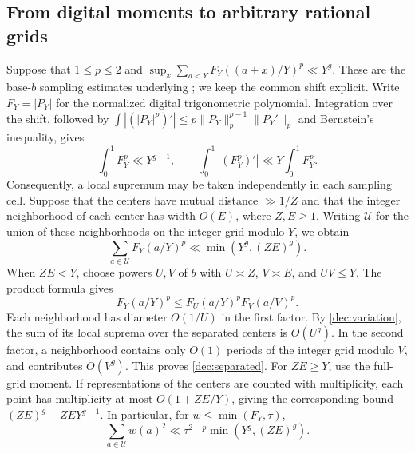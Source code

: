 \documentclass[11pt,a4paper]{article}
\theoremstyle{paperplain}
\numberwithin{equation}{section}
\begin{document}
\subsection{From digital moments to arbitrary rational grids}
\label{dec:grids}

Suppose that $1\le p\le2$ and
$\sup_x\sum_{a<Y}F_Y((a+x)/Y)^p\ll Y^g$.
These are the base-$b$ sampling estimates underlying
\cite[Lemmas 10.5--10.7]{Maynard2019}; we keep the common shift explicit.
Write $F_Y=|P_Y|$ for the normalized digital trigonometric polynomial.
Integration over the shift, followed by
$\int|(|P_Y|^p)'|\le p\|P_Y\|_p^{p-1}\|P_Y'\|_p$
and Bernstein's inequality, gives
\begin{equation}\label{dec:variation}
 \int_0^1F_Y^p\ll Y^{g-1},\qquad
 \int_0^1|(F_Y^p)'|\ll Y\int_0^1F_Y^p.
\end{equation}
Consequently, a local supremum may be taken independently in each sampling
cell. Suppose that the centers have mutual distance $\gg1/Z$ and that
the integer neighborhood of each center has width $O(E)$, where $Z,E\ge1$.
Writing $\mathcal U$ for the union of these neighborhoods on the integer
grid modulo $Y$, we obtain
\begin{equation}\label{dec:separated}
 \sum_{a\in\mathcal U}F_Y(a/Y)^p\ll\min(Y^g,(ZE)^g).
\end{equation}
When $ZE<Y$, choose powers $U,V$ of $b$ with
$U\asymp Z$, $V\asymp E$, and $UV\le Y$. The product formula gives
\[
 F_Y(a/Y)^p\le F_U(a/Y)^p F_V(a/V)^p.
\]
Each neighborhood has diameter $O(1/U)$ in the first factor.
By \eqref{dec:variation}, the sum of its local suprema over the
separated centers is $O(U^g)$. In the second factor, a neighborhood
contains only $O(1)$ periods of the integer grid modulo $V$,
and contributes $O(V^g)$. This proves \eqref{dec:separated}.
For $ZE\ge Y$, use the full-grid moment.
If representations of the centers are counted with multiplicity, each
point has multiplicity at most $O(1+ZE/Y)$, giving the corresponding bound
$(ZE)^g+ZEY^{g-1}$. In particular, for $w\le\min(F_Y,\tau)$,
\begin{equation}\label{dec:squarearc}
 \sum_{a\in\mathcal U}w(a)^2
 \ll\tau^{2-p}\min(Y^g,(ZE)^g).
\end{equation}
\end{document}
